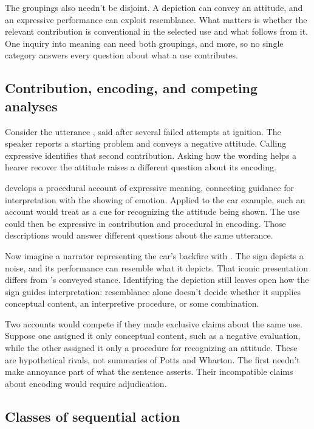 \documentclass[12pt]{article}
\begin{document}
The groupings also needn't be disjoint. A depiction can convey an attitude,
and an expressive performance can exploit resemblance. What matters is
whether the relevant contribution is conventional in the selected use and
what follows from it. One inquiry into meaning can need both groupings,
and more, so no single category answers every question about what a use
contributes.

\subsection{Contribution, encoding, and competing analyses}\label{sec:encoding}

Consider the utterance ,
said after several failed attempts at ignition. The speaker reports a
starting problem and conveys a negative attitude. Calling 
expressive identifies that second contribution. Asking how the wording
helps a hearer recover the attitude raises a different question about
its encoding.

\textcite{wharton2016expressives} develops a procedural account of expressive
meaning, connecting guidance for interpretation with the showing of emotion.
Applied to the car example, such an account would treat 
as a cue for recognizing the attitude being shown. The use could then
be expressive in contribution and procedural in encoding. Those descriptions
would answer different questions about the same utterance.

Now imagine a narrator representing the car's backfire with .
The sign depicts a noise, and its performance can resemble what it
depicts. That iconic presentation differs from 's conveyed
stance. Identifying the depiction still leaves open how the sign guides
interpretation: resemblance alone doesn't decide whether it supplies
conceptual content, an interpretive procedure, or some combination.

Two accounts would compete if they made exclusive claims
about the same  use. Suppose one assigned it only
conceptual content, such as a negative evaluation, while the other
assigned it only a procedure for recognizing an attitude. These are
hypothetical rivals, not summaries of Potts and Wharton. The first
needn't make annoyance part of what the sentence asserts. Their
incompatible claims about encoding would require adjudication.

\subsection{Classes of sequential action}
\end{document}
